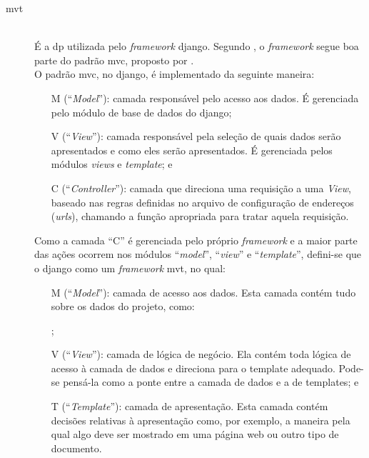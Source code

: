 \begin{description}
%
    \item[\gls{mvt}] \hfill \\
        É a \gls{dp} utilizada pelo \textit{framework} \gls{django}. Segundo , o \textit{framework} segue boa parte do padrão \gls{mvc}, proposto por .\\
        O padrão \gls{mvc}, no \gls{django}, é implementado da seguinte maneira:
        \begin{itemize}
	        \item[M](``\textit{Model}''): camada responsável pelo acesso aos dados. É gerenciada pelo módulo de base de dados do \gls{django};
	        \item[V](``\textit{View}''): camada responsável pela seleção de quais dados serão apresentados e como eles serão apresentados. É gerenciada pelos módulos \textit{views} e \textit{template}; e
	        \item[C](``\textit{Controller}''): camada que direciona uma requisição a uma \textit{View}, baseado nas regras definidas no arquivo de configuração de endereços (\textit{urls}), chamando a função apropriada para tratar aquela requisição.
        \end{itemize}
        Como a camada ``C'' é gerenciada pelo próprio \textit{framework} e a maior parte das ações ocorrem nos módulos ``\textit{model}'', ``\textit{view}'' e ``\textit{template}'', defini-se que o \gls{django} como um \textit{framework} \gls{mvt}, no qual:
        \begin{itemize}
	        \item[M](``\textit{Model}''): camada de acesso aos dados. Esta camada contém tudo sobre os dados do projeto, como:
            ;
            \item[V](``\textit{View}''): camada de lógica de negócio. Ela contém toda lógica de acesso à camada de dados e direciona para o template adequado. Pode-se pensá-la como a ponte entre a camada de dados e a de templates; e
            \item[T](``\textit{Template}''): camada de apresentação. Esta camada contém decisões relativas à apresentação como, por exemplo, a maneira pela qual algo deve ser mostrado em uma página web ou outro tipo de documento.
        \end{itemize}
\end{description}